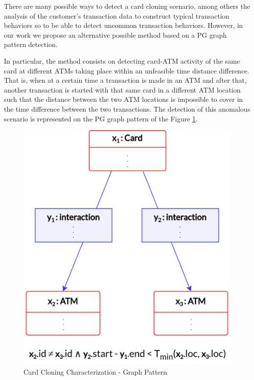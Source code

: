 There are many possible ways to detect a card cloning scenario, among others the analysis of the customer's transaction data to construct typical transaction behaviors so to be able to detect uncommon transaction behaviors. However, in our work we propose an alternative possible method based on a PG graph pattern detection.

In particular, the method consists on detecting card-ATM activity of the same card at different ATMs taking place within an unfeasible time distance difference. That is, when at a certain time a transaction is made in an ATM and after that, another transaction is started with that same card in a different ATM location such that the distance between the two ATM locations is impossible to cover in the time difference between the two transactions. The detection of this anomalous scenario is represented on the PG graph pattern of the Figure \ref{img:graphPattern-1}. 

\begin{figure}[H]
  \centering
  \includegraphics[scale = 0.8]{images/2-QueryModel/graphPattern-1.png}
  \caption{Card Cloning Characterization - Graph Pattern}
  \label{img:graphPattern-1}
\end{figure}

